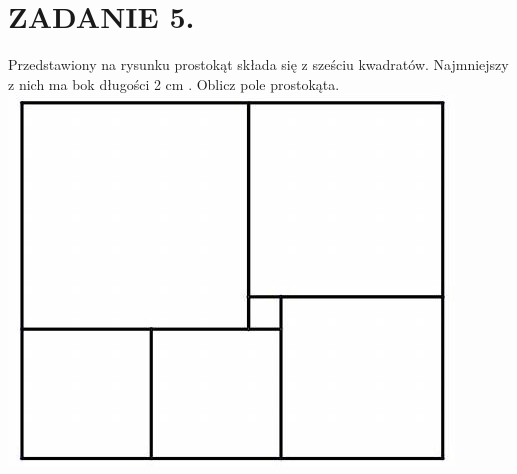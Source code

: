 \documentclass[10pt]{article}
\begin{document}
\section*{ZADANIE 5.}
Przedstawiony na rysunku prostokąt składa się z sześciu kwadratów. Najmniejszy z nich ma bok długości 2 cm . Oblicz pole prostokąta.\\
\includegraphics[max width=\textwidth, center]{2024_11_21_a1bccce644610f08c774g-1}
\end{document}
